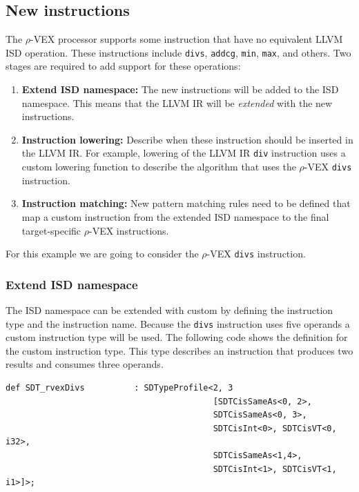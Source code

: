 \subsection{New instructions}
The $\rho$-VEX processor supports some instruction that have no equivalent LLVM ISD operation. These instructions include \texttt{divs}, \texttt{addcg}, \texttt{min}, \texttt{max}, and others. Two stages are required to add support for these operations:

\begin{enumerate}
  \item \textbf{Extend ISD namespace:} The new instructions will be added to the ISD namespace. This means that the LLVM IR will be \emph{extended} with the new instructions.
  \item \textbf{Instruction lowering:} Describe when these instruction should be inserted in the LLVM IR. For example, lowering of the LLVM IR \texttt{div} instruction uses a custom lowering function to describe the algorithm that uses the $\rho$-VEX \texttt{divs} instruction.
  \item \textbf{Instruction matching:} New pattern matching rules need to be defined that map a custom instruction from the extended ISD namespace to the final target-specific $\rho$-VEX instructions.
\end{enumerate}

For this example we are going to consider the $\rho$-VEX \texttt{divs} instruction.

\subsubsection{Extend ISD namespace}
The ISD namespace can be extended with custom by defining the instruction type and the instruction name. Because the \texttt{divs} instruction uses five operands a custom instruction type will be used. The following code shows the definition for the custom instruction type. This type describes an instruction that produces two results and consumes three operands.

\begin{lstlisting}[language=tblgen]
def SDT_rvexDivs          : SDTypeProfile<2, 3
                                          [SDTCisSameAs<0, 2>,
                                          SDTCisSameAs<0, 3>,
                                          SDTCisInt<0>, SDTCisVT<0, i32>,
                                          SDTCisSameAs<1,4>,
                                          SDTCisInt<1>, SDTCisVT<1, i1>]>;
\end{lstlisting}

